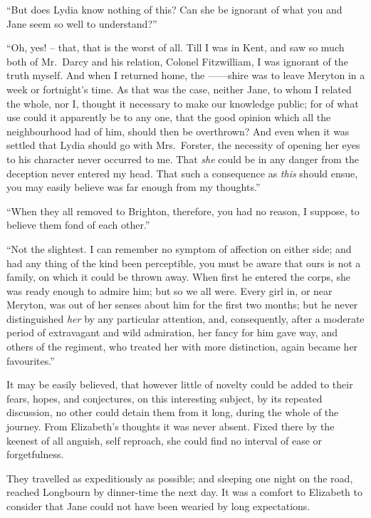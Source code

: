 “But does Lydia know nothing of this? Can she be
ignorant of what you and Jane seem so well to
understand?”

“Oh, yes! -- that, that is the worst of all. Till I was
in Kent, and saw so much both of Mr.\ Darcy and his
relation, Colonel Fitzwilliam, I was ignorant of the truth
myself. And when I returned home, the \hbox{------shire} was
to leave Meryton in a week or fortnight’s time. As that
was the case, neither Jane, to whom I related the whole,
nor I, thought it necessary to make our knowledge public;
for of what use could it apparently be to any one, that
the good opinion which all the neighbourhood had of
him, should then be overthrown? And even when it was
settled that Lydia should go with Mrs.\ Forster, the necessity
of opening her eyes to his character never occurred
to me. That \textit{she} could be in any danger from the deception
never entered my head. That such a consequence as \textit{this}
should ensue, you may easily believe was far enough from
my thoughts.”

“When they all removed to Brighton, therefore, you
had no reason, I suppose, to believe them fond of each
other.”

“Not the slightest. I can remember no symptom of
affection on either side; and had any thing of the kind
been perceptible, you must be aware that ours is not a
family, on which it could be thrown away. When first
he entered the corps, she was ready enough to admire
him; but so we all were. Every girl in, or near Meryton,
was out of her senses about him for the first two months;
but he never distinguished \textit{her} by any particular attention,
and, consequently, after a moderate period of extravagant
and wild admiration, her fancy for him gave way, and others
of the regiment, who treated her with more distinction,
again became her favourites.”

\strut

It may be easily believed, that however little of novelty
could be added to their fears, hopes, and conjectures, on
this interesting subject, by its repeated discussion, no
other could detain them from it long, during the whole
of the journey. From Elizabeth’s thoughts it was never
absent. Fixed there by the keenest of all anguish, self
reproach, she could find no interval of ease or
forgetfulness.

They travelled as expeditiously as possible; and sleeping
one night on the road, reached Longbourn by dinner-time
the next day. It was a comfort to Elizabeth to consider
that Jane could not have been wearied by long
expectations.

